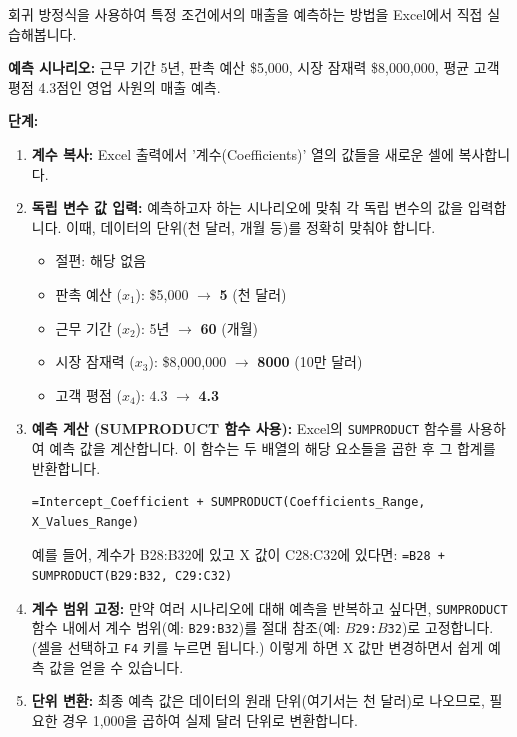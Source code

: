 \documentclass[11pt,a4paper]{article}
\theoremstyle{definition}
\begin{document}
\newpage
\begin{tcolorbox}[title=\textbf{Excel을 이용한 예측 수행}]
회귀 방정식을 사용하여 특정 조건에서의 매출을 예측하는 방법을 Excel에서 직접 실습해봅니다.

\textbf{예측 시나리오:}
근무 기간 5년, 판촉 예산 \$5,000, 시장 잠재력 \$8,000,000, 평균 고객 평점 4.3점인 영업 사원의 매출 예측.

\textbf{단계:}
\begin{enumerate}
    \item \textbf{계수 복사:} Excel 출력에서 '계수(Coefficients)' 열의 값들을 새로운 셀에 복사합니다.
    \item \textbf{독립 변수 값 입력:} 예측하고자 하는 시나리오에 맞춰 각 독립 변수의 값을 입력합니다. 이때, 데이터의 단위(천 달러, 개월 등)를 정확히 맞춰야 합니다.
    \begin{itemize}
        \item 절편: 해당 없음
        \item 판촉 예산 ($x_1$): \$5,000 $\rightarrow$ \textbf{5} (천 달러)
        \item 근무 기간 ($x_2$): 5년 $\rightarrow$ \textbf{60} (개월)
        \item 시장 잠재력 ($x_3$): \$8,000,000 $\rightarrow$ \textbf{8000} (10만 달러)
        \item 고객 평점 ($x_4$): 4.3 $\rightarrow$ \textbf{4.3}
    \end{itemize}
    \item \textbf{예측 계산 (SUMPRODUCT 함수 사용):} Excel의 \texttt{SUMPRODUCT} 함수를 사용하여 예측 값을 계산합니다. 이 함수는 두 배열의 해당 요소들을 곱한 후 그 합계를 반환합니다.
    \begin{lstlisting}[language=Excel, caption=SUMPRODUCT 함수를 이용한 예측]
=Intercept_Coefficient + SUMPRODUCT(Coefficients_Range, X_Values_Range)
    \end{lstlisting}
    예를 들어, 계수가 B28:B32에 있고 X 값이 C28:C32에 있다면:
    \texttt{=B28 + SUMPRODUCT(B29:B32, C29:C32)}
    \item \textbf{계수 범위 고정:} 만약 여러 시나리오에 대해 예측을 반복하고 싶다면, \texttt{SUMPRODUCT} 함수 내에서 계수 범위(예: \texttt{B29:B32})를 절대 참조(예: \texttt{$B$29:$B$32})로 고정합니다. (셀을 선택하고 \texttt{F4} 키를 누르면 됩니다.) 이렇게 하면 X 값만 변경하면서 쉽게 예측 값을 얻을 수 있습니다.
    \item \textbf{단위 변환:} 최종 예측 값은 데이터의 원래 단위(여기서는 천 달러)로 나오므로, 필요한 경우 1,000을 곱하여 실제 달러 단위로 변환합니다.
\end{enumerate}


\end{tcolorbox}
\end{document}

